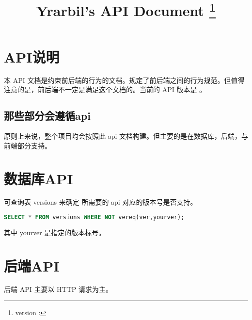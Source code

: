 \documentclass[UTF8]{ctexart}
\title{Yrarbil's API Document \thanks{version : \apiver}}
\begin{document}
    \maketitle
    \newpage
    
    \tableofcontents
    \newpage
    \section{API说明}
    本 API 文档是约束前后端的行为的文档。规定了前后端之间的行为规范。但值得注意的是，前后端不一定是满足这个文档的。当前的 API 版本是 \apiver 。
    \subsection{那些部分会遵循api}
    原则上来说，整个项目均会按照此 api 文档构建。但主要的是在数据库，后端，与前端部分支持。
    
    
    \section{数据库API}
    可查询表 versions 来确定 所需要的 api 对应的版本号是否支持。
    \begin{lstlisting}[language=SQL]
SELECT * FROM versions WHERE NOT vereq(ver,yourver);
    \end{lstlisting}
    其中 yourver 是指定的版本标号。
    
    \section{后端API}
    后端 API 主要以 HTTP 请求为主。
\end{document}
